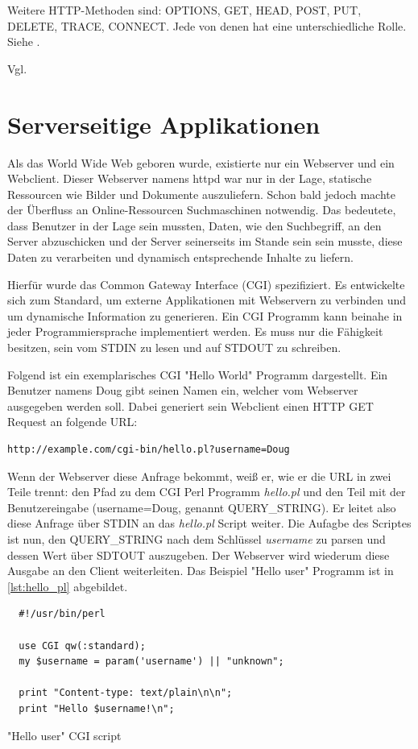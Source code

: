 Weitere HTTP-Methoden sind: OPTIONS, GET, HEAD, POST, PUT, DELETE, TRACE, CONNECT.
Jede von denen hat eine unterschiedliche Rolle. Siehe \citep[Kap. 4]{http_spec}.

Vgl. \citep{dubost}

\section{Serverseitige Applikationen}

Als das World Wide Web geboren wurde, existierte nur ein Webserver und ein Webclient. Dieser Webserver namens httpd war nur in der Lage, statische Ressourcen wie Bilder und Dokumente auszuliefern. Schon bald jedoch machte der Überfluss an Online-Ressourcen Suchmaschinen notwendig. Das bedeutete, dass Benutzer in der Lage sein mussten, Daten, wie den Suchbegriff, an den Server abzuschicken und der Server seinerseits im Stande sein sein musste, diese Daten zu verarbeiten und dynamisch entsprechende Inhalte zu liefern.

Hierfür wurde das Common Gateway Interface (CGI) spezifiziert. Es entwickelte sich zum Standard, um externe Applikationen mit Webservern zu verbinden und um dynamische Information zu generieren. Ein CGI Programm kann beinahe in jeder Programmiersprache implementiert werden. Es muss nur die Fähigkeit besitzen, sein vom STDIN zu lesen und auf STDOUT zu schreiben.

Folgend ist ein exemplarisches CGI "Hello World" Programm dargestellt. Ein Benutzer namens Doug gibt seinen Namen ein, welcher vom Webserver ausgegeben werden soll. Dabei generiert sein Webclient einen HTTP GET Request an folgende URL:

\begin{verbatim}
http://example.com/cgi-bin/hello.pl?username=Doug
\end{verbatim}

Wenn der Webserver diese Anfrage bekommt, weiß er, wie er die URL in zwei Teile trennt: den Pfad zu dem CGI Perl Programm \emph{hello.pl} und den Teil mit der Benutzereingabe (username=Doug, genannt QUERY\_STRING). Er leitet also diese Anfrage über STDIN an das \emph{hello.pl} Script weiter. Die Aufagbe des Scriptes ist nun, den QUERY\_STRING nach dem Schlüssel \emph{username} zu parsen und dessen Wert über SDTOUT auszugeben. Der Webserver wird wiederum diese Ausgabe an den Client weiterleiten. Das Beispiel "Hello user" Programm ist in \ref{lst:hello_pl} abgebildet.

\begin{listing}[H]
\begin{verbatim}
  #!/usr/bin/perl

  use CGI qw(:standard);
  my $username = param('username') || "unknown";

  print "Content-type: text/plain\n\n";
  print "Hello $username!\n";
\end{verbatim}
\caption{"Hello user" CGI script}
\label{lst:hello_pl}
\end{listing}

